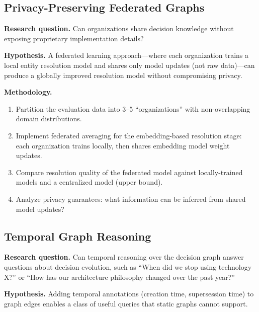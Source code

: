 \subsection{Privacy-Preserving Federated Graphs}
\label{sec:future-federated}

\noindent\textbf{Research question.}
Can organizations share decision knowledge without exposing proprietary
implementation details?

\medskip\noindent\textbf{Hypothesis.}
A federated learning approach---where each organization trains a local
entity resolution model and shares only model updates (not raw data)---can
produce a globally improved resolution model without compromising privacy.

\medskip\noindent\textbf{Methodology.}

\begin{enumerate}
    \item Partition the evaluation data into 3--5 ``organizations'' with
          non-overlapping domain distributions.
    \item Implement federated averaging for the embedding-based resolution
          stage: each organization trains locally, then shares embedding
          model weight updates.
    \item Compare resolution quality of the federated model against
          locally-trained models and a centralized model (upper bound).
    \item Analyze privacy guarantees: what information can be inferred
          from shared model updates?
\end{enumerate}


\subsection{Temporal Graph Reasoning}
\label{sec:future-temporal}

\noindent\textbf{Research question.}
Can temporal reasoning over the decision graph answer questions about
decision evolution, such as ``When did we stop using technology X?'' or
``How has our architecture philosophy changed over the past year?''

\medskip\noindent\textbf{Hypothesis.}
Adding temporal annotations (creation time, supersession time) to graph
edges enables a class of useful queries that static graphs cannot support.

